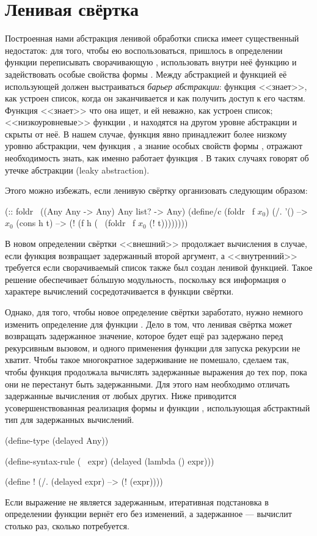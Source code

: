 \section[2]{Ленивая свёртка}%
Построенная нами абстракция ленивой обработки списка имеет существенный недостаток:
для того, чтобы ею воспользоваться, пришлось в определении функции  переписывать сворачивающую , использовать внутри неё функцию \s{!} и задействовать особые свойства формы . Между абстракцией и функцией её использующей должен выстраиваться \emph{барьер абстракции}: функция  <<знает>>, как устроен список, когда он заканчивается и как получить доступ к его частям. Функция  <<знает>> что она ищет, и ей неважно, как устроен список; <<низкоуровневые>> функции ,  и  находятся на другом уровне абстракции и скрыты от неё. В нашем случае, функция \s{!} явно принадлежит более низкому уровню абстракции, чем функция , а знание особых свойств формы , отражают необходимость знать, как именно работает функция . В таких случаях говорят об утечке абстракции (leaky abstraction).

Этого можно избежать, если ленивую свёртку организовать следующим образом:

\label{lazy-fold}
\begin{Definition}[emph={f,lst,h,t}]
(:: foldr~ ((Any Any -> Any) Any list? -> Any)
  (define/c (foldr~ f $x_0$)
    (/. '() --> $x_0$
        (cons h t) --> (! (f h (~ (foldr~ f $x_0$ (! t))))))))
\end{Definition}

\noindent
В новом определении свёртки <<внешний>> \s{!} продолжает вычисления в случае, если функция  возвращает задержанный второй аргумент, а <<внутренний>> требуется если сворачиваемый список также был создан ленивой функцией. Такое решение обеспечивает б\'{о}льшую модульность, поскольку вся информация о характере вычислений сосредотачивается в функции свёртки.

Однако, для того, чтобы новое определение свёртки заработато, нужно немного изменить определение для функции \s{!}. Дело в том, что ленивая свёртка может возвращать задержанное значение, которое будет ещё раз задержано перед рекурсивным вызовом, и одного применения функции \s{!} для запуска рекурсии не хватит. Чтобы такое многократное задерживание не помешало, сделаем так, чтобы функция \s{!} продолжала вычислять задержанные выражения до тех пор, пока они не перестанут быть задержанными. Для этого нам необходимо отличать задержанные вычисления от любых других. Ниже приводится усовершенствованная реализация формы \s{~} и функции \s{!}, использующая абстрактный тип для задержанных вычислений.
\begin{Definition}
(define-type (delayed Any))

(define-syntax-rule (~ expr)
  (delayed (lambda () expr)))

(define !
  (/. (delayed expr) --> (! (expr))))
\end{Definition}
\noindent
Если выражение не является задержанным, итеративная подстановка в определении функции \s{!} вернёт его без изменений, а задержанное --- вычислит столько раз, сколько потребуется.

